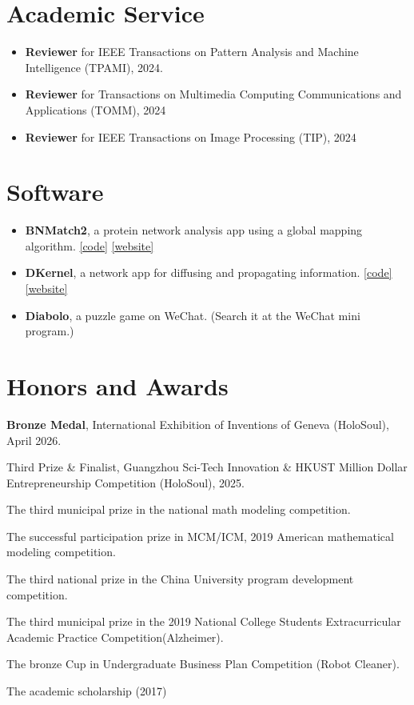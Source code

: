 \documentclass[letterpaper,10.8pt]{article}
\newcommand{\resumeSubHeadingListStart}{\begin{itemize}[leftmargin=*]}
\newcommand{\resumeSubHeadingListEnd}{\end{itemize}}
\begin{document}
\section{Academic Service}
\resumeSubHeadingListStart
\item{\textbf{Reviewer} for IEEE Transactions on Pattern Analysis and Machine Intelligence (TPAMI), 2024.}

\item{\textbf{Reviewer} for Transactions on Multimedia Computing Communications and Applications (TOMM), 2024}

\item{\textbf{Reviewer} for IEEE Transactions on Image Processing (TIP), 2024}
\resumeSubHeadingListEnd
\section{Software}
\resumeSubHeadingListStart
\item{\textbf{BNMatch2}, a protein network analysis app using a global mapping algorithm.
\href{https://github.com/164140757/Dynamic-Network-Algorithm}{[code]}
\href{https://apps.cytoscape.org/apps/bnmatch2}{[website]}}

\item{\textbf{DKernel}, a network app for diffusing and propagating information.
\href{https://github.com/164140757/Dynamic-Network-Algorithm}{[code]}
\href{https://apps.cytoscape.org/apps/dkernel}{[website]}}
\item{\textbf{Diabolo}, a puzzle game on WeChat. (Search it at the WeChat mini program.) }
\resumeSubHeadingListEnd

\section{Honors and Awards}
\begin{description}[font=$\bullet$]
\item {\textbf{Bronze Medal}, International Exhibition of Inventions of Geneva (HoloSoul), April 2026.}
\item {Third Prize \& Finalist, Guangzhou Sci-Tech Innovation \& HKUST Million Dollar Entrepreneurship Competition (HoloSoul), 2025.}
\item {The third municipal prize in the national math modeling competition.}
\item {The successful participation prize in MCM/ICM, 2019 American mathematical modeling competition.} 
\item {The third national prize in the China University program development competition.}
\item {The third municipal prize in the 2019 National College Students Extracurricular Academic Practice Competition(Alzheimer).}
\item {The bronze Cup in Undergraduate Business Plan Competition (Robot Cleaner).}
\item {The academic scholarship (2017)}
\end{description}

\end{document}
